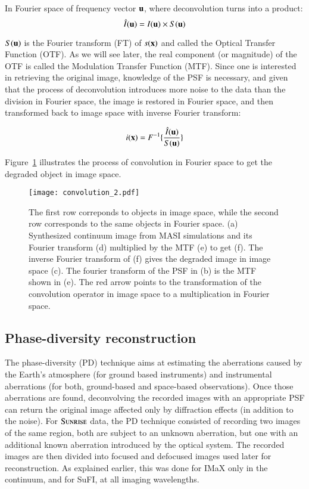 \documentclass[goettingen, gauss, print]{thesis}
\begin{document}
In Fourier space of frequency vector $\bold{u}$, where deconvolution turns into a product:
\begin{equation}
\hat{I}(\bold{u}) = I(\bold{u}) \times S(\bold{u})
\end{equation}

$S(\bold{u})$ is the Fourier transform (FT) of $s(\bold{x})$ and called the Optical Transfer Function (OTF). As we will see later, the real component (or magnitude) of the OTF is called the Modulation Transfer Function (MTF). 
Since one is interested in retrieving the original image, knowledge of the PSF is necessary, and given that the process of deconvolution introduces more noise to the data than the division in Fourier space, the image is restored in Fourier space, and then transformed back to image space with inverse Fourier transform:

\begin{equation}
i(\bold{x}) = F^{-1}\{\frac{\hat{I}(\bold{u})}{S(\bold{u})}  \}
\end{equation}

Figure~\ref{convolution} illustrates the process of convolution in Fourier space to get the degraded object in image space.

\begin{figure}
\centering
\hspace*{-2cm}\texttt{[image: convolution\_2.pdf]}
\label{convolution}
\caption{The first row correponds to objects in image space, while the second row corresponds to the same objects in Fourier space. (a) Synthesized continuum image from MASI simulations \citep{riethmuller_new_2017} and its Fourier transform (d) multiplied by the MTF (e) to get (f). The inverse Fourier transform of (f) gives the degraded image in image space (c). The fourier transform of the PSF in (b) is the MTF shown in (e). The red arrow points to the transformation of the convolution operator in image space to a multiplication in Fourier space.} 
\end{figure}
\fi

\subsection{Phase-diversity reconstruction} %
\label{intro-PD}


The phase-diversity (PD) technique aims at estimating the aberrations caused by the Earth's atmosphere (for ground based instruments) and instrumental aberrations (for both, ground-based and space-based observations). Once those aberrations are found, deconvolving the recorded images with an appropriate PSF can return the original image affected only by diffraction effects (in addition to the noise).
For $\textsc{Sunrise}$ data, the PD technique consisted of recording two images of the same region, both are subject to an unknown aberration, but one with an additional known aberration introduced by the optical system. The recorded images are then divided into focused and defocused images used later for reconstruction.
As explained earlier, this was done for IMaX only in the continuum, and for SuFI, at all imaging wavelengths.\\
\end{document}
